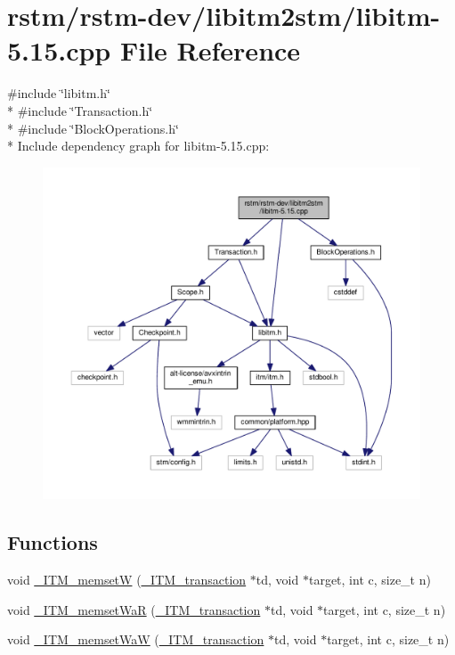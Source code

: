 \hypertarget{libitm-5_815_8cpp}{\section{rstm/rstm-\/dev/libitm2stm/libitm-\/5.15.cpp File Reference}
\label{libitm-5_815_8cpp}
}
{\ttfamily \#include \char`\"{}libitm.\-h\char`\"{}}\\*
{\ttfamily \#include \char`\"{}Transaction.\-h\char`\"{}}\\*
{\ttfamily \#include \char`\"{}Block\-Operations.\-h\char`\"{}}\\*
Include dependency graph for libitm-\/5.15.cpp\-:
\nopagebreak
\begin{figure}[H]
\begin{center}
\leavevmode
\includegraphics[width=350pt]{libitm-5_815_8cpp__incl}
\end{center}
\end{figure}
\subsection*{Functions}
\begin{DoxyCompactItemize}
\item 
void \hyperlink{libitm-5_815_8cpp_a9a136608841dc81b35f0cf4353f26453}{\-\_\-\-I\-T\-M\-\_\-memset\-W} (\hyperlink{libitm_8h_a65d3a93d285fdbde408558d6b431abc8}{\-\_\-\-I\-T\-M\-\_\-transaction} $\ast$td, void $\ast$target, int c, size\-\_\-t n)
\item 
void \hyperlink{libitm-5_815_8cpp_a1f165beca90ceb5c1d6466d032d6bb89}{\-\_\-\-I\-T\-M\-\_\-memset\-Wa\-R} (\hyperlink{libitm_8h_a65d3a93d285fdbde408558d6b431abc8}{\-\_\-\-I\-T\-M\-\_\-transaction} $\ast$td, void $\ast$target, int c, size\-\_\-t n)
\item 
void \hyperlink{libitm-5_815_8cpp_a1b27ecbf3a4a3fcd4b1778d987a4d07e}{\-\_\-\-I\-T\-M\-\_\-memset\-Wa\-W} (\hyperlink{libitm_8h_a65d3a93d285fdbde408558d6b431abc8}{\-\_\-\-I\-T\-M\-\_\-transaction} $\ast$td, void $\ast$target, int c, size\-\_\-t n)
\end{DoxyCompactItemize}


